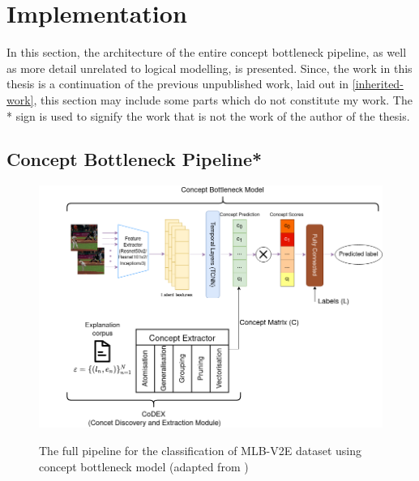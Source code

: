 

\chapter{Implementation}

In this section, the architecture of the entire concept bottleneck pipeline, as well as more detail unrelated to logical modelling, is presented.
Since, the work in this thesis is a continuation of the previous unpublished work, laid out in \autoref{inherited-work}, this section may include some parts which do not constitute my work. 
The * sign is used to signify the work that is not the work of the author of the thesis.


\section{Concept Bottleneck Pipeline*}

\begin{figure}[h]
\caption{The full pipeline for the classification of MLB-V2E dataset using concept bottleneck model (adapted from \cite{RefWorks:RefID:16-2021automatic})}
\centering
\includegraphics[width=\textwidth]{implementation/full architecture diagram.png}
\label{full-architecture-diagram}
\end{figure}

